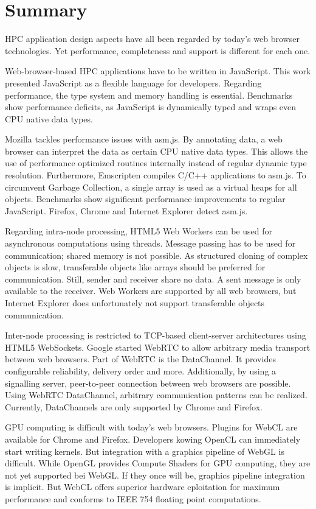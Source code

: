 \section{Summary} \label{chapter_summary}

HPC application design aspects have all been regarded by today's web browser technologies. Yet performance, completeness and support is different for each one.

Web-browser-based HPC applications have to be written in JavaScript. This work presented JavaScript as a flexible language for developers. Regarding performance, the type system and memory handling is essential. Benchmarks show performance deficits, as JavaScript is dynamically typed and wraps even CPU native data types.

Mozilla tackles performance issues with asm.js. By annotating data, a web browser can interpret the data as certain CPU native data types. This allows the use of performance optimized routines internally instead of regular dynamic type resolution. Furthermore, Emscripten compiles C/C++ applications to asm.js. To circumvent Garbage Collection, a single array is used as a virtual heaps for all objects. Benchmarks show significant performance improvements to regular JavaScript. Firefox, Chrome and Internet Explorer detect asm.js.

Regarding intra-node processing, HTML5 Web Workers can be used for asynchronous computations using threads. Message passing has to be used for communication; shared memory is not possible. As structured cloning of complex objects is slow, transferable objects like arrays should be preferred for communication. Still, sender and receiver share no data. A sent message is only available to the receiver. Web Workers are supported by all web browsers, but Internet Explorer does unfortunately not support transferable objects communication.

Inter-node processing is restricted to TCP-based client-server architectures using HTML5 WebSockets. Google started WebRTC to allow arbitrary media transport between web browsers. Part of WebRTC is the DataChannel. It provides configurable reliability, delivery order and more. Additionally, by using a signalling server, peer-to-peer connection between web browsers are possible. Using WebRTC DataChannel, arbitrary communication patterns can be realized. Currently, DataChannels are only supported by Chrome and Firefox.

GPU computing is difficult with today's web browsers. Plugins for WebCL are available for Chrome and Firefox. Developers kowing OpenCL can immediately start writing kernels. But integration with a graphics pipeline of WebGL is difficult. While OpenGL provides Compute Shaders for GPU computing, they are not yet supported bei WebGL. If they once will be, graphics pipeline integration is implicit. But WebCL offers superior hardware eploitation for maximum performance and conforms to IEEE 754 floating point computations.
